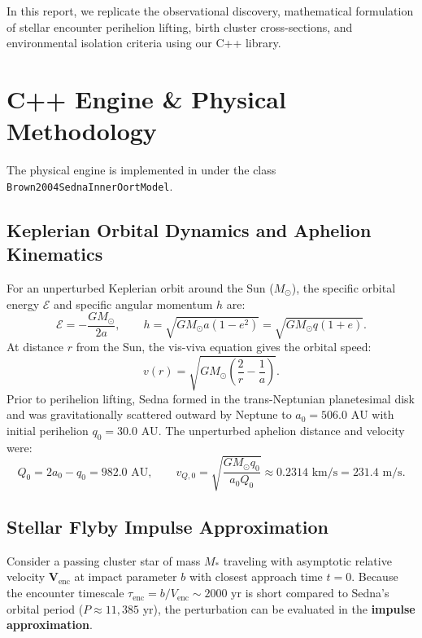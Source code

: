 \documentclass[11pt,a4paper]{article}
\begin{document}
In this report, we replicate the observational discovery, mathematical formulation of stellar encounter perihelion lifting, birth cluster cross-sections, and environmental isolation criteria using our C++ library.

\section{C++ Engine \& Physical Methodology}
The physical engine is implemented in  under the class \linebreak \texttt{Brown2004SednaInnerOortModel}.

\subsection{Keplerian Orbital Dynamics and Aphelion Kinematics}
For an unperturbed Keplerian orbit around the Sun ($M_\odot$), the specific orbital energy $\mathcal{E}$ and specific angular momentum $h$ are:
\begin{equation}
\mathcal{E} = -\frac{G M_\odot}{2a}, \qquad h = \sqrt{G M_\odot a (1 - e^2)} = \sqrt{G M_\odot q (1 + e)}.
\end{equation}
At distance $r$ from the Sun, the vis-viva equation gives the orbital speed:
\begin{equation}
v(r) = \sqrt{G M_\odot \left( \frac{2}{r} - \frac{1}{a} \right)}.
\end{equation}
Prior to perihelion lifting, Sedna formed in the trans-Neptunian planetesimal disk and was gravitationally scattered outward by Neptune to $a_0 = 506.0\text{ AU}$ with initial perihelion $q_0 = 30.0\text{ AU}$. The unperturbed aphelion distance and velocity were:
\begin{equation}
Q_0 = 2a_0 - q_0 = 982.0\text{ AU}, \qquad v_{Q,0} = \sqrt{\frac{G M_\odot q_0}{a_0 Q_0}} \approx 0.2314\text{ km/s} = 231.4\text{ m/s}.
\end{equation}

\subsection{Stellar Flyby Impulse Approximation}
Consider a passing cluster star of mass $M_*$ traveling with asymptotic relative velocity $\mathbf{V}_{\text{enc}}$ at impact parameter $b$ with closest approach time $t = 0$. Because the encounter timescale $\tau_{\text{enc}} = b / V_{\text{enc}} \sim 2000\text{ yr}$ is short compared to Sedna's orbital period ($P \approx 11,385\text{ yr}$), the perturbation can be evaluated in the \textbf{impulse approximation}.
\end{document}
